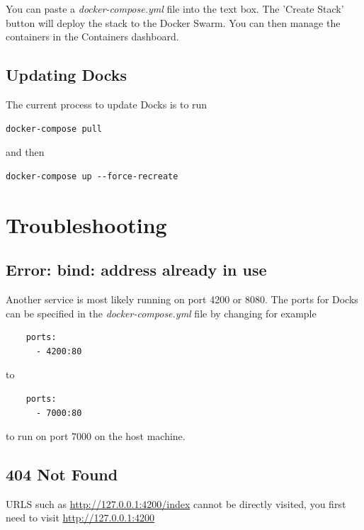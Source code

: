 \documentclass[]{article}
\begin{document}
You can paste a \emph{docker-compose.yml} file into the text box. The 'Create Stack' button will deploy the stack to the Docker Swarm. You can then manage the containers in the Containers dashboard.

\subsection{Updating Docks}
The current process to update Docks is to run

\begin{lstlisting}
docker-compose pull
\end{lstlisting}

and then

\begin{lstlisting}
docker-compose up --force-recreate
\end{lstlisting}

\section{Troubleshooting}
\subsection{Error: bind: address already in use}
Another service is most likely running on port 4200 or 8080. The ports for Docks
can be specified in the \emph{docker-compose.yml} file by changing for example

\begin{lstlisting}
    ports:
      - 4200:80
\end{lstlisting}
to
\begin{lstlisting}
    ports:
      - 7000:80
\end{lstlisting}
to run on port 7000 on the host machine.

\subsection{404 Not Found}
URLS such as \url{http://127.0.0.1:4200/index} cannot be directly visited, you first need to visit \url{http://127.0.0.1:4200}
\end{document}
